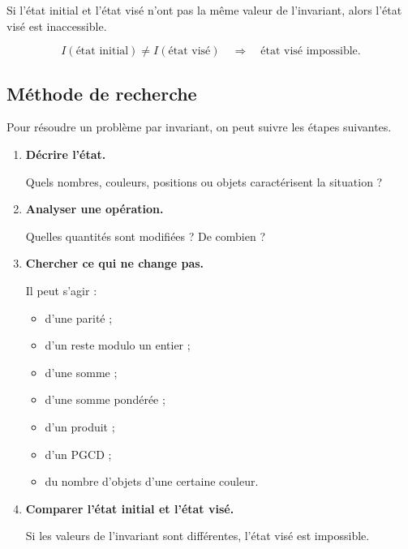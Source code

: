 Si l'état initial et l'état visé n'ont pas la même valeur de l'invariant,
alors l'état visé est inaccessible.

\[
\boxed{
I(\text{état initial})\neq I(\text{état visé})
\quad\Longrightarrow\quad
\text{état visé impossible}.
}
\]

\subsection{Méthode de recherche}

Pour résoudre un problème par invariant, on peut suivre les étapes suivantes.

\begin{enumerate}
    \item \textbf{Décrire l'état.}

    Quels nombres, couleurs, positions ou objets caractérisent la situation ?

    \item \textbf{Analyser une opération.}

    Quelles quantités sont modifiées ? De combien ?

    \item \textbf{Chercher ce qui ne change pas.}

    Il peut s'agir :
    \begin{itemize}
        \item d'une parité ;
        \item d'un reste modulo un entier ;
        \item d'une somme ;
        \item d'une somme pondérée ;
        \item d'un produit ;
        \item d'un PGCD ;
        \item du nombre d'objets d'une certaine couleur.
    \end{itemize}

    \item \textbf{Comparer l'état initial et l'état visé.}

    Si les valeurs de l'invariant sont différentes, l'état visé est impossible.
\end{enumerate}

\begin{center}
\end{center}

